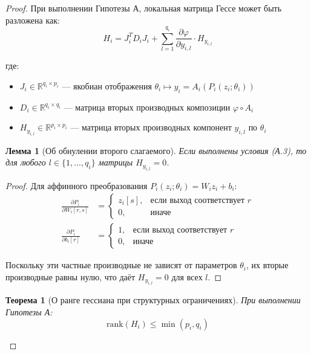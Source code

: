\documentclass[a4paper,12pt]{article}
\newtheorem{theorem}{Теорема}
\newtheorem{lemma}{Лемма}
\begin{document}
\begin{proof}
    При выполнении Гипотезы А, локальная матрица Гессе может быть разложена как:
    \begin{equation}
    H_i = J_i^T D_i J_i + \sum_{l=1}^{q_i} \frac{\partial \varphi}{\partial y_{i,l}} \cdot H_{y_{i,l}}
    \end{equation}
    
    где:
    \begin{itemize}
    \item $J_i \in \mathbb{R}^{q_i \times p_i}$ — якобиан отображения $\theta_i \mapsto y_i = A_i(P_i(z_i; \theta_i))$
    \item $D_i \in \mathbb{R}^{q_i \times q_i}$ — матрица вторых производных композиции $\varphi \circ A_i$
    \item $H_{y_{i,l}} \in \mathbb{R}^{p_i \times p_i}$ — матрица вторых производных компонент $y_{i,l}$ по $\theta_i$
    \end{itemize}
    
    \begin{lemma}[Об обнулении второго слагаемого]
    Если выполнены условия (А.3), то для любого $l \in \{1,\ldots,q_i\}$ матрицы $H_{y_{i,l}} = 0$.
    \end{lemma}
    
    \begin{proof}
    Для аффинного преобразования $P_i(z_i; \theta_i) = W_i z_i + b_i$:
    \begin{align}
    \frac{\partial P_i}{\partial W_i[r,s]} &= \begin{cases} z_i[s], & \text{если выход соответствует } r \\ 0, & \text{иначе} \end{cases} \\
    \frac{\partial P_i}{\partial b_i[r]} &= \begin{cases} 1, & \text{если выход соответствует } r \\ 0, & \text{иначе} \end{cases}
    \end{align}
    
    Поскольку эти частные производные не зависят от параметров $\theta_i$, их вторые производные равны нулю, что даёт $H_{y_{i,l}} = 0$ для всех $l$.
    \end{proof}
    
    \begin{theorem}[О ранге гессиана при структурных ограничениях]
    При выполнении Гипотезы А:
    \begin{equation}
    \text{rank}(H_i) \leq \min(p_i, q_i)
    \end{equation}
    \end{theorem}
    

\end{proof}
\end{document}
